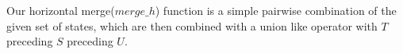 Our horizontal merge($merge\_h$) function is a simple pairwise combination of the given set of states, which are then combined with a union like operator with $T$ preceding $S$ preceding $U$.
%
%

